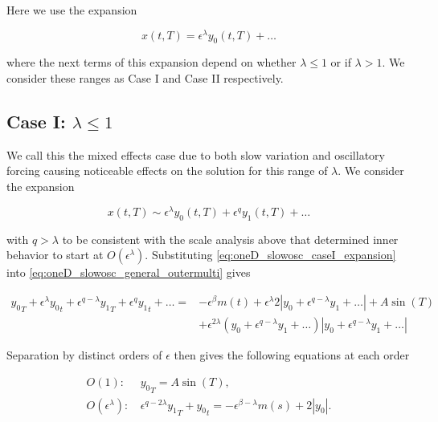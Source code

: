 Here we use the expansion 

\begin{equation*}
x(t,T) = \epsilon^{\lambda}y_0(t,T) +\ldots 
\end{equation*}

where the next terms of this expansion depend on whether $\lambda\le1$ or if $\lambda> 1$. We consider these ranges as Case I and Case II respectively.

\subsection{Case I: $\lambda \le 1$}
\label{subsec:oneD_slowosc_caseI}

We call this the mixed effects case due to both slow variation and oscillatory forcing causing noticeable effects on the solution for this range of $\lambda$. We consider the expansion

\begin{equation}\label{eq:oneD_slowosc_caseI_expansion}
x(t,T)\sim \epsilon^{\lambda} y_0(t,T)+\epsilon^q y_1(t,T)+\ldots
\end{equation}

with $q>\lambda$ to be consistent with the scale analysis above that determined inner behavior to start at $O(\epsilon^\lambda)$. Substituting \eqref{eq:oneD_slowosc_caseI_expansion} into \eqref{eq:oneD_slowosc_general_outermulti} gives

\begin{equation*}
\begin{aligned}
{y_0}_T+\epsilon^{\lambda}{y_0}_t+\epsilon^{q-\lambda} {y_1}_T+\epsilon^{q} {y_1}_t+\ldots={} & -\epsilon^{\beta}m(t)+\epsilon^\lambda 2|y_0 +\epsilon^{q-\lambda} y_1+\ldots|+  A\sin(T)  \\
& + \epsilon^{2\lambda}( y_0 +\epsilon^{q-\lambda} y_1+\ldots)|y_0 +\epsilon^{q-\lambda} y_1+\ldots |
\end{aligned}
\end{equation*}

Separation by distinct orders of $\epsilon$ then gives the following equations at each order

\begin{align} \label{eq:oneD_slowosc_caseI_O1}
O(1):\, & {y_0}_T = A\sin(T),\\ \label{eq:oneD_slowosc_caseI_O2}
O(\epsilon^\lambda): \, & \epsilon^{q-2\lambda}{y_1}_T+{y_0}_t=-\epsilon^{\beta-\lambda}m(s)+2|y_0|.
\end{align}

